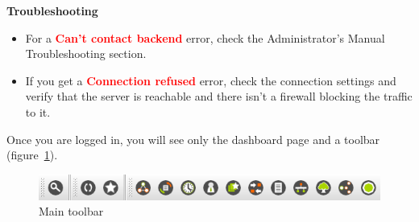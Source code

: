 \documentclass[a4paper]{article}
\begin{document}
	\begin{framed} {\large \textbf{Troubleshooting}}
		\begin{itemize}
			\item For a \textbf{\textcolor{red}{Can't contact backend}} error, check the Administrator's Manual Troubleshooting section.
			\item If you get a \textbf{\textcolor{red}{Connection refused}} error, check the connection settings and verify that the server is reachable and there isn't a firewall blocking the traffic to it.
		\end{itemize}
	\end{framed} 
	Once you are logged in, you will see only the dashboard page and a toolbar (figure~\ref{fig:main_toolbar}).\\
	\begin{figure}[h!]
		\centering
		\includegraphics[width=0.7\linewidth]{img/main_toolbar.png}
		\caption{Main toolbar}
		\label{fig:main_toolbar}
	\end{figure}
	
\end{document}
